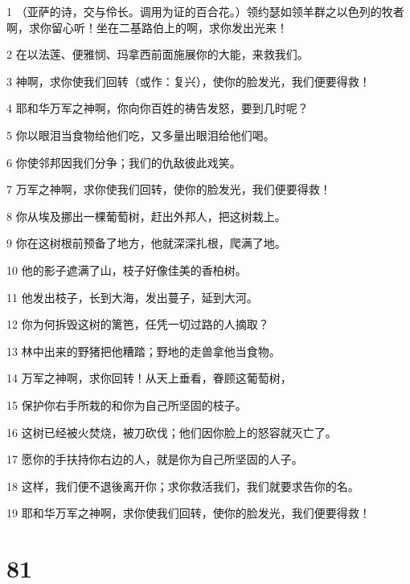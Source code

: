 \par 1 （亚萨的诗，交与伶长。调用为证的百合花。）领约瑟如领羊群之以色列的牧者啊，求你留心听！坐在二基路伯上的啊，求你发出光来！
\par 2 在以法莲、便雅悯、玛拿西前面施展你的大能，来救我们。
\par 3 神啊，求你使我们回转（或作：复兴），使你的脸发光，我们便要得救！
\par 4 耶和华万军之神啊，你向你百姓的祷告发怒，要到几时呢？
\par 5 你以眼泪当食物给他们吃，又多量出眼泪给他们喝。
\par 6 你使邻邦因我们分争；我们的仇敌彼此戏笑。
\par 7 万军之神啊，求你使我们回转，使你的脸发光，我们便要得救！
\par 8 你从埃及挪出一棵葡萄树，赶出外邦人，把这树栽上。
\par 9 你在这树根前预备了地方，他就深深扎根，爬满了地。
\par 10 他的影子遮满了山，枝子好像佳美的香柏树。
\par 11 他发出枝子，长到大海，发出蔓子，延到大河。
\par 12 你为何拆毁这树的篱笆，任凭一切过路的人摘取？
\par 13 林中出来的野猪把他糟踏；野地的走兽拿他当食物。
\par 14 万军之神啊，求你回转！从天上垂看，眷顾这葡萄树，
\par 15 保护你右手所栽的和你为自己所坚固的枝子。
\par 16 这树已经被火焚烧，被刀砍伐；他们因你脸上的怒容就灭亡了。
\par 17 愿你的手扶持你右边的人，就是你为自己所坚固的人子。
\par 18 这样，我们便不退後离开你；求你救活我们，我们就要求告你的名。
\par 19 耶和华万军之神啊，求你使我们回转，使你的脸发光，我们便要得救！

\chapter{81}

